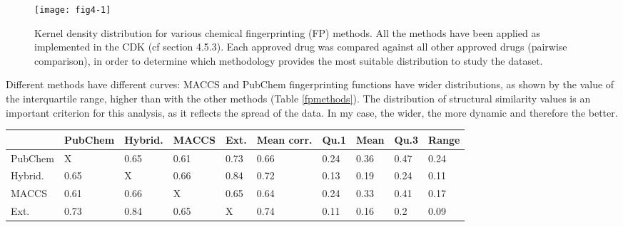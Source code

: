 \begin{figure}[H]
    \centering
    \texttt{[image: fig4-1]}
    \caption{Kernel density distribution for various chemical fingerprinting (FP) methods. All the methods have been applied as implemented in the CDK (cf section 4.5.3). Each approved drug was compared against all other approved drugs (pairwise comparison), in order to determine which methodology provides the most suitable distribution to study the dataset.}
    \label{fig4-1}
\end{figure}

Different methods have different curves: MACCS and PubChem fingerprinting functions have wider distributions, as shown by the value of the interquartile range, higher than with the other methods (Table \ref{fpmethods}). The distribution of structural similarity values is an important criterion for this analysis, as it reflects the spread of the data. In my case, the wider, the more dynamic and therefore the better.

\begin{center}
\small
    \begin{tabular}{| l | l | l | l | l | l || l | l | l | l |}
    \hline
 & PubChem & Hybrid. & MACCS & Ext. & Mean corr. & Qu.1 & Mean & Qu.3 & Range \\ \hline \hline 
PubChem & X & 0.65 & 0.61 & 0.73 & 0.66 & 0.24 & 0.36 & 0.47 & 0.24 \\ \hline
Hybrid. & 0.65 & X & 0.66 & 0.84 & 0.72 & 0.13 & 0.19 & 0.24 & 0.11 \\ \hline
MACCS & 0.61 & 0.66 & X & 0.65 & 0.64 & 0.24 & 0.33 & 0.41 & 0.17 \\ \hline
Ext. & 0.73 & 0.84 & 0.65 & X & 0.74 & 0.11 & 0.16 & 0.2 & 0.09 \\ \hline
    \end{tabular} 
    \label{fpmethods}
\end{center}

